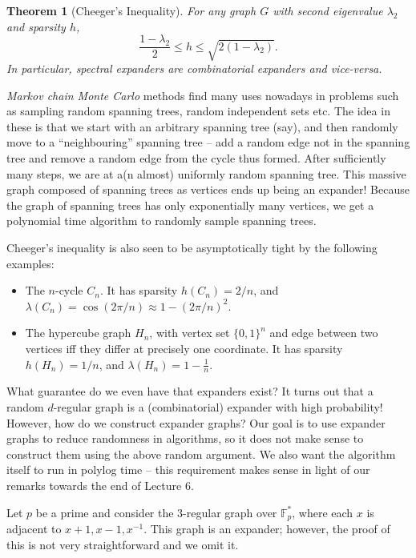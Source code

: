 \documentclass{article}
\newcounter{lecnum}
\newtheorem{theorem}{Theorem}[lecnum]
\newcommand{\F}{\mathbb{F}}
\begin{document}
	\begin{theorem}[Cheeger's Inequality]
		\label{cheeger inequality}
		For any graph $G$ with second eigenvalue $\lambda_2$ and sparsity $h$,
		\[ \frac{1-\lambda_2}{2} \le h \le \sqrt{2(1-\lambda_2)}. \]
		In particular, spectral expanders are combinatorial expanders and vice-versa.
	\end{theorem}

	\emph{Markov chain Monte Carlo} methods find many uses nowadays in problems such as sampling random spanning trees, random independent sets etc. The idea in these is that we start with an arbitrary spanning tree (say), and then randomly move to a ``neighbouring'' spanning tree -- add a random edge not in the spanning tree and remove a random edge from the cycle thus formed. After sufficiently many steps, we are at a(n almost) uniformly random spanning tree. This massive graph composed of spanning trees as vertices ends up being an expander! Because the graph of spanning trees has only exponentially many vertices, we get a polynomial time algorithm to randomly sample spanning trees.

	Cheeger's inequality is also seen to be asymptotically tight by the following examples:
	\begin{itemize}
		\item The $n$-cycle $C_n$. It has sparsity $h(C_n) = 2/n$, and $\lambda(C_n) = \cos(2\pi/n) \approx 1 - (2\pi/n)^2$.
		\item The hypercube graph $H_n$, with vertex set $\{0,1\}^n$ and edge between two vertices iff they differ at precisely one coordinate. It has sparsity $h(H_n) = 1/n$, and $\lambda(H_n) = 1 - \frac{1}{n}$.
	\end{itemize}

	What guarantee do we even have that expanders exist? It turns out that a random $d$-regular graph is a (combinatorial) expander with high probability!\\

	However, how do we construct expander graphs? Our goal is to use expander graphs to reduce randomness in algorithms, so it does not make sense to construct them using the above random argument. We also want the algorithm itself to run in polylog time -- this requirement makes sense in light of our remarks towards the end of Lecture 6.

	Let $p$ be a prime and consider the $3$-regular graph over $\F_p^*$, where each $x$ is adjacent to $x+1,x-1,x^{-1}$. This graph is an expander; however, the proof of this is not very straightforward and we omit it.
\end{document}
